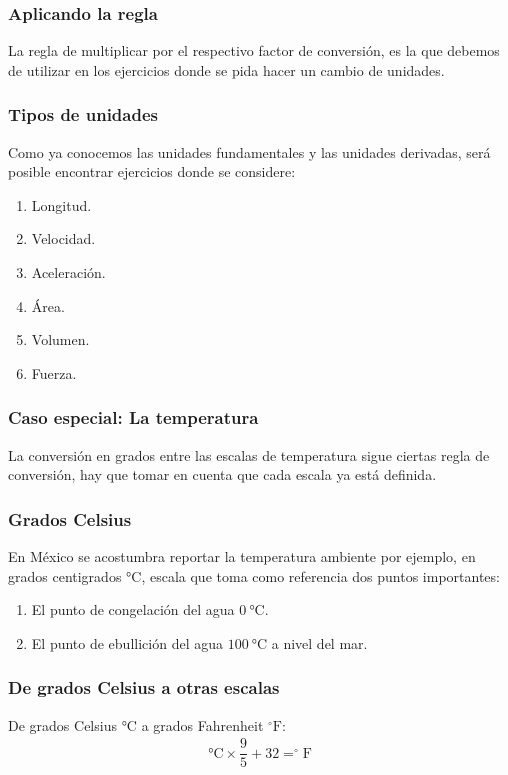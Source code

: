\documentclass[12pt]{beamer}
\begin{document}
\begin{frame}
\frametitle{Aplicando la regla}
La regla de multiplicar por el respectivo factor de conversión, es la que debemos de utilizar en los ejercicios donde se pida hacer un cambio de unidades.
\end{frame}
\begin{frame}
\frametitle{Tipos de unidades}
Como ya conocemos las unidades fundamentales y las unidades derivadas, será posible encontrar ejercicios donde se considere:
\begin{enumerate}[<+->]
\item Longitud.
\item Velocidad.
\item Aceleración.
\item Área.
\item Volumen.
\item Fuerza.
\end{enumerate}
\end{frame}
\begin{frame}
\frametitle{Caso especial: La temperatura}
La conversión en grados entre las escalas de temperatura sigue ciertas regla de conversión, hay que tomar en cuenta que cada escala ya está definida.
\end{frame}
\begin{frame}
\frametitle{Grados Celsius}
En México se acostumbra reportar la temperatura ambiente por ejemplo, en grados centigrados $\unit{\degreeCelsius}$, \pause escala que toma como referencia dos puntos importantes:
\pause
{}
\begin{enumerate}[<+->]
\item El punto de congelación del agua $\SI{0}{\degreeCelsius}$.
\item El punto de ebullición del agua $\SI{100}{\degreeCelsius}$ a nivel del mar.
\end{enumerate}
\end{frame}
\begin{frame}
\frametitle{De grados Celsius a otras escalas}
De grados Celsius $\unit{\degreeCelsius}$ a grados Fahrenheit $^{\circ} \text{F}$:
\pause
\begin{align*}
\unit{\degreeCelsius} \times \dfrac{9}{5} + 32 = ^{\circ} \text{F}
\end{align*}
\end{frame}
\end{document}
